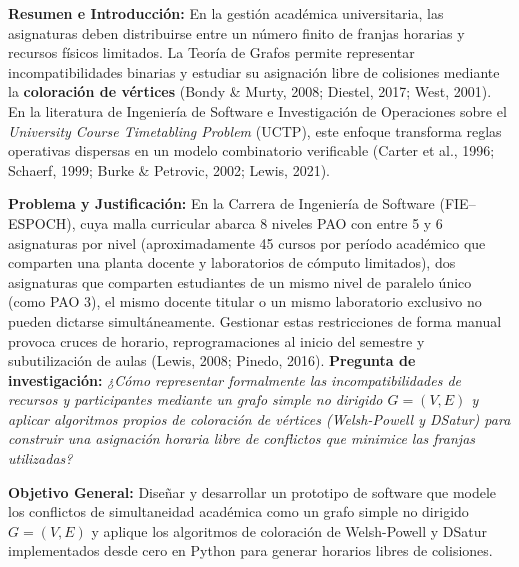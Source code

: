 \documentclass[12pt,a4paper]{article}
\theoremstyle{definition}
\begin{document}
\textbf{Resumen e Introducción:} En la gestión académica universitaria, las asignaturas deben distribuirse entre un número finito de franjas horarias y recursos físicos limitados. La Teoría de Grafos permite representar incompatibilidades binarias y estudiar su asignación libre de colisiones mediante la \textbf{coloración de vértices} (Bondy \& Murty, 2008; Diestel, 2017; West, 2001). En la literatura de Ingeniería de Software e Investigación de Operaciones sobre el \textit{University Course Timetabling Problem} (UCTP), este enfoque transforma reglas operativas dispersas en un modelo combinatorio verificable (Carter et al., 1996; Schaerf, 1999; Burke \& Petrovic, 2002; Lewis, 2021).

\textbf{Problema y Justificación:} En la Carrera de Ingeniería de Software (FIE--ESPOCH), cuya malla curricular abarca 8 niveles PAO con entre 5 y 6 asignaturas por nivel (aproximadamente 45 cursos por período académico que comparten una planta docente y laboratorios de cómputo limitados), dos asignaturas que comparten estudiantes de un mismo nivel de paralelo único (como PAO 3), el mismo docente titular o un mismo laboratorio exclusivo no pueden dictarse simultáneamente. Gestionar estas restricciones de forma manual provoca cruces de horario, reprogramaciones al inicio del semestre y subutilización de aulas (Lewis, 2008; Pinedo, 2016).
\textbf{Pregunta de investigación:} \textit{¿Cómo representar formalmente las incompatibilidades de recursos y participantes mediante un grafo simple no dirigido $G = (V, E)$ y aplicar algoritmos propios de coloración de vértices (Welsh-Powell y DSatur) para construir una asignación horaria libre de conflictos que minimice las franjas utilizadas?}

\textbf{Objetivo General:} Diseñar y desarrollar un prototipo de software que modele los conflictos de simultaneidad académica como un grafo simple no dirigido $G = (V, E)$ y aplique los algoritmos de coloración de Welsh-Powell y DSatur implementados desde cero en Python para generar horarios libres de colisiones.
\end{document}
